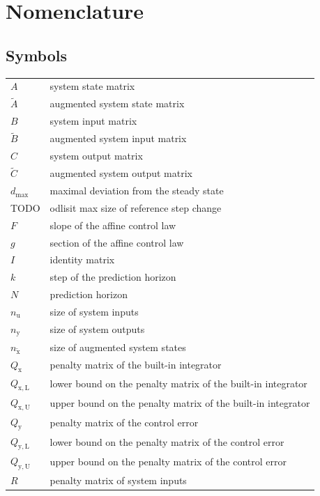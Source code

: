 \documentclass[preprint,12pt]{elsarticle}
\begin{document}
\section*{Nomenclature}

\subsection*{Symbols}
\begin{center}
	\begin{tabular}{ l l }
$A$ & system state matrix \\
$\widetilde{A}$ & augmented system state matrix \\
$B$ & system input matrix \\
$\widetilde{B}$ & augmented system input matrix \\
$C$ & system output matrix \\
$\widetilde{C}$ & augmented system output matrix \\
$d_{\max}$ & maximal deviation from the steady state \\
TODO & odlisit max size of reference step change \\
$F$ & slope of the affine control law \\
$g$ & section of the affine control law \\
$I$ & identity matrix \\	
$k$ & step of the prediction horizon \\
$N$ & prediction horizon \\
$n_{\mathrm{u}}$ & size of system inputs \\
$n_{\mathrm{y}}$ & size of system outputs \\
$n_{\widetilde{\mathrm{x}}}$ & size of augmented system states \\
$Q_{\mathrm{x}}$ & penalty matrix of the built-in integrator \\
$Q_{\mathrm{x,L}}$ & lower bound on the penalty matrix of the built-in integrator \\
$Q_{\mathrm{x,U}}$ & upper bound on the penalty matrix of the built-in integrator \\
$Q_{\mathrm{y}}$ & penalty matrix of the control error \\
$Q_{\mathrm{y,L}}$ & lower bound on the penalty matrix of the control error \\
$Q_{\mathrm{y,U}}$ & upper bound on the penalty matrix of the control error \\
$R$ & penalty matrix of system inputs \\

\end{tabular}
\end{center}
\end{document}
